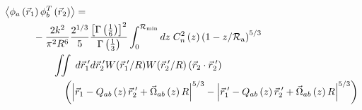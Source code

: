 \begin{equation}\label{eqn:tprphase_n6}
\begin{aligned}
&\left\langle \phi_{a}\left(\vec{r}_{1}\right) \phi^{T}_{b}\left(\vec{r}_{2}\right)\right\rangle = \\
&\quad\quad\quad
-\frac{2k^{2}}{\pi^{2}R^{6}} 
\frac{2^{1/3}}{5}\frac{\left[\Gamma\left(\frac{1}{6}\right)\right]^{2}}{\Gamma\left(\frac{1}{3}\right)} 
\int_{0}^{\mathcal{R}_{\rm min}} dz\;C_{n}^{2}\left(z\right) 
\left(1 - z/\mathcal{R}_{\rm a}\right)^{5/3}\\
&\quad\quad\quad\quad\quad
\iint  \; d\vec{r}^{\;\prime}_{1}d\vec{r}^{\;\prime}_{2} W(\vec{r}^{\;\prime}_{1}/R) W(\vec{r}^{\;\prime}_{2}/R)
\left(\vec{r}_{2} \cdot \vec{r}^{\;\prime}_{2}\right)
\\
&\quad\quad\quad\quad\quad\quad
\left(
\left\vert \vec{r}_{1} - Q_{ab}\left(z\right)\vec{r}^{\;\prime}_{2} + \vec{\Omega}_{ab}\left(z\right) R\right\vert^{5/3}
- \left\vert \vec{r}^{\;\prime}_{1}  - 
 Q_{ab}\left(z\right)\vec{r}^{\;\prime}_{2} + \vec{\Omega}_{ab}\left(z\right) R \right\vert^{5/3}
\right)
\end{aligned}
\end{equation}

